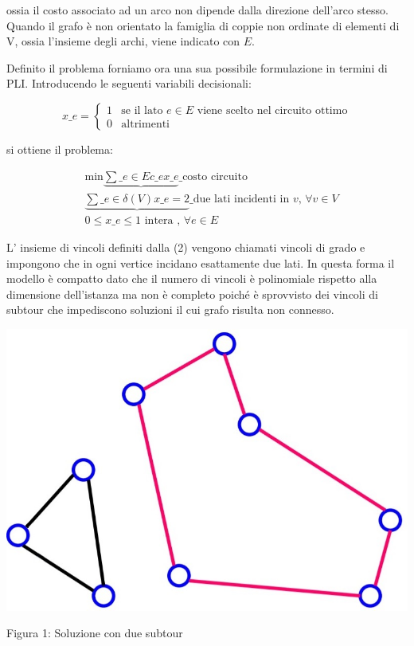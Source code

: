 \documentclass[11pt]{article}
\begin{document}
ossia il costo associato ad un arco non dipende dalla direzione dell'arco stesso. Quando il grafo \`e non orientato la famiglia di coppie non ordinate di elementi di V, ossia l'insieme degli archi, viene indicato con $E$.


Definito il problema forniamo ora una sua possibile formulazione in termini di PLI. Introducendo le seguenti variabili decisionali:

\[
x\_{e}=
\begin{cases}
1 & \text{se il lato $e \in E$ viene scelto nel circuito ottimo} \\
0 & \text{altrimenti}
\end{cases}
\]

si ottiene il problema:

\begin{eqnarray}
& \text{min}\displaystyle\underbrace{\sum\_{e \in E} c\_e x\_e}\_{\text{costo circuito}} \\[1.5ex]
&\displaystyle\underbrace{\sum\_{e \in \delta(V)} x\_e = 2}\_{\text{due lati incidenti in }v}\text{,  }\forall v \in V \\[1.5ex]
&0\leq x\_e \leq 1 \text{ intera , }\forall e \in E
\end{eqnarray}

L' insieme di vincoli definiti dalla (2) vengono chiamati vincoli di grado e impongono che in ogni vertice incidano esattamente due lati. In questa forma il modello \`e  compatto dato che il numero di vincoli \`e polinomiale rispetto alla dimensione dell'istanza ma non \`e completo poich\'e \`e sprovvisto dei vincoli di subtour che impediscono soluzioni il cui grafo risulta non connesso.

\begin{center}
\includegraphics[scale=0.5]{subtour}  

Figura 1: Soluzione con due subtour
\end{center}
\end{document}
